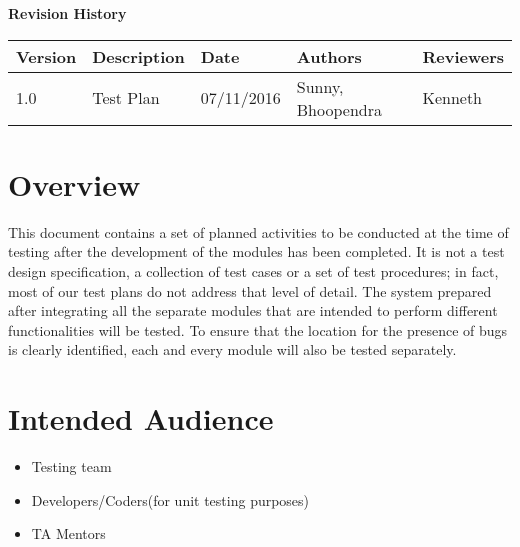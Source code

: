 \documentclass[12pt]{article}
\begin{document}
	\textbf{Revision History}
	\begin{center}
		\begin{tabular}{ | m{3em} | m{8em} | m{5em} | m{4em} | m{4em} | }
			\hline
			Version & Description & Date       & Authors            & Reviewers \\
			\hline
			1.0     & Test Plan    & 07/11/2016 & Sunny, Bhoopendra & Kenneth  \\ 

			\hline
		
		\end{tabular}
	\end{center}
	
	\newpage
	\tableofcontents
	
	\newpage
\section{Overview}
This document contains a set of planned activities to be conducted at the time of testing after the development of the modules has been completed. It is not a test design specification, a collection of test cases or a set of test procedures; in fact, most of our test plans do not address that level of detail. The system prepared after integrating all the separate modules that are intended to perform different functionalities will be tested. To ensure that the location for the presence of bugs is clearly identified, each and every module will also be tested separately.
\section{Intended Audience}
\begin{itemize}
    \item Testing team
    \item Developers/Coders(for unit testing purposes)
    \item TA Mentors
\end{itemize}
\end{document}

